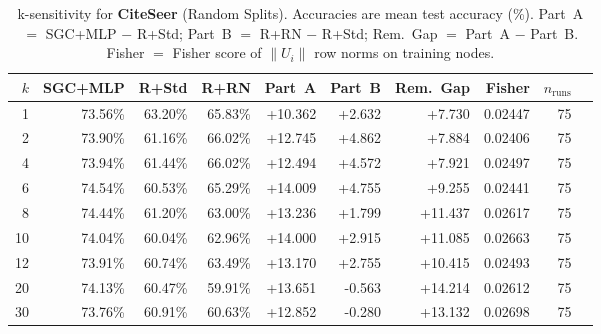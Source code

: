 \begin{table}[t]
\centering\small\setlength{\tabcolsep}{5pt}
\caption{k-sensitivity for \textbf{CiteSeer} (Random Splits). Accuracies are mean test accuracy (\%). Part~A $=$ SGC+MLP $-$ R+Std; Part~B $=$ R+RN $-$ R+Std; Rem.~Gap $=$ Part~A $-$ Part~B. Fisher $=$ Fisher score of $\|U_i\|$ row norms on training nodes.}
\label{tab:exp8_per_dataset_citeseer_random}
\begin{tabular}{rrrrrrrrrr}
\toprule
$k$ & SGC+MLP & R+Std & R+RN & Part~A & Part~B & Rem.~Gap & Fisher & $n_{\mathrm{runs}}$ \\
\midrule
1 & 73.56\% & 63.20\% & 65.83\% & +10.362 & +2.632 & +7.730 & 0.02447 & 75 \\
2 & 73.90\% & 61.16\% & 66.02\% & +12.745 & +4.862 & +7.884 & 0.02406 & 75 \\
4 & 73.94\% & 61.44\% & 66.02\% & +12.494 & +4.572 & +7.921 & 0.02497 & 75 \\
6 & 74.54\% & 60.53\% & 65.29\% & +14.009 & +4.755 & +9.255 & 0.02441 & 75 \\
8 & 74.44\% & 61.20\% & 63.00\% & +13.236 & +1.799 & +11.437 & 0.02617 & 75 \\
10 & 74.04\% & 60.04\% & 62.96\% & +14.000 & +2.915 & +11.085 & 0.02663 & 75 \\
12 & 73.91\% & 60.74\% & 63.49\% & +13.170 & +2.755 & +10.415 & 0.02493 & 75 \\
20 & 74.13\% & 60.47\% & 59.91\% & +13.651 & -0.563 & +14.214 & 0.02612 & 75 \\
30 & 73.76\% & 60.91\% & 60.63\% & +12.852 & -0.280 & +13.132 & 0.02698 & 75 \\
\bottomrule
\end{tabular}
\end{table}
